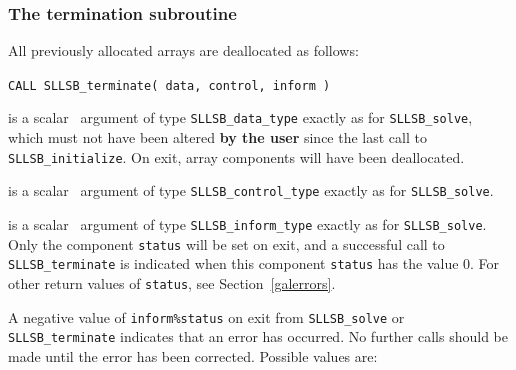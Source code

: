 \documentclass{galahad}
\newcommand{\packagename}{SLLSB}
\begin{document}

\subsubsection{The  termination subroutine}
All previously allocated arrays are deallocated as follows:
\vspace*{1mm}

\hspace{8mm}
{\tt CALL \packagename\_terminate( data, control, inform )}

\vspace*{-3mm}
\begin{description}

 is a scalar \intentinout\ argument of type
{\tt \packagename\_data\_type}
exactly as for
{\tt \packagename\_solve},
which must not have been altered {\bf by the user} since the last call to
{\tt \packagename\_initialize}.
On exit, array components will have been deallocated.

 is a scalar \intentin\ argument of type
{\tt \packagename\_control\_type}
exactly as for
{\tt \packagename\_solve}.

 is a scalar \intentout\ argument of type
{\tt \packagename\_inform\_type}
exactly as for
{\tt \packagename\_solve}.
Only the component {\tt status} will be set on exit, and a
successful call to
{\tt \packagename\_terminate}
is indicated when this  component {\tt status} has the value 0.
For other return values of {\tt status}, see Section~\ref{galerrors}.

\end{description}



\galerrors
A negative value of {\tt inform\%status} on exit from
{\tt \packagename\_solve}
or
{\tt \packagename\_terminate}
indicates that an error has occurred. No further calls should be made
until the error has been corrected. Possible values are:
\end{document}
